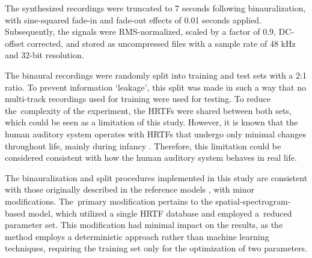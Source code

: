 The synthesized recordings were truncated to 7 seconds following binauralization, with sine-squared fade-in and fade-out effects of 0.01 seconds applied. Subsequently, the signals were RMS-normalized, scaled by a factor of 0.9, DC-offset corrected, and stored as uncompressed files with a sample rate of 48 kHz and 32-bit resolution.

The binaural recordings were randomly split into training and test sets with a 2:1 ratio. To prevent information `leakage', this split was made in such a way that no multi-track recordings used for training were used for testing. To reduce the~complexity of the experiment, the HRTFs were shared between both sets, which could be seen as a limitation of this study. However, it is known that the human auditory system operates with HRTFs that undergo only minimal changes throughout life, mainly during infancy \cite{king_how_2001}. Therefore, this limitation could be considered consistent with how the human auditory system behaves in real life. 

The binauralization and split procedures implemented in this study are consistent with those originally described in the reference models \cite{antoniuk_blind_2023,antoniuk_ensemble_2024,antoniuk_estimating_2024}, with minor modifications. The~primary modification pertains to the spatial-spectrogram-based model, which utilized a single HRTF database and employed a~reduced parameter set. This modification had minimal impact on the results, as the method employs a deterministic approach rather than machine learning techniques, requiring the training set only for the optimization of two parameters.
